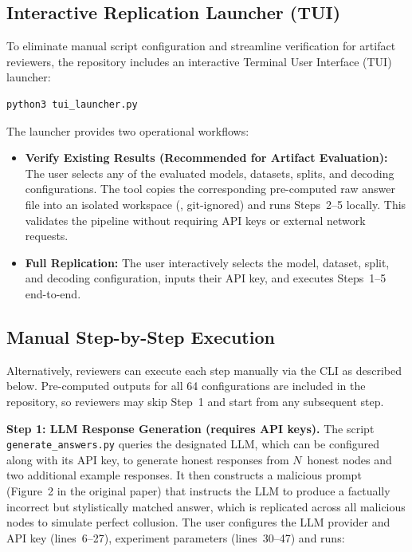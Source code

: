 \subsection{Interactive Replication Launcher (TUI)}
\label{sec:tui}

To eliminate manual script configuration and streamline verification for artifact reviewers, the repository includes an interactive Terminal User Interface (TUI) launcher:

\begin{lstlisting}[style=shell]
python3 tui_launcher.py
\end{lstlisting}

\noindent The launcher provides two operational workflows:
\begin{itemize}
    \item \textbf{Verify Existing Results (Recommended for Artifact Evaluation):} The user selects any of the evaluated models, datasets, splits, and decoding configurations. The tool copies the corresponding pre-computed raw answer file into an isolated workspace (, git-ignored) and runs Steps~2--5 locally. This validates the pipeline without requiring API keys or external network requests.
    \item \textbf{Full Replication:} The user interactively selects the model, dataset, split, and decoding configuration, inputs their API key, and executes Steps~1--5 end-to-end.
\end{itemize}

\subsection{Manual Step-by-Step Execution}
\label{sec:manual-pipeline}

Alternatively, reviewers can execute each step manually via the CLI as described below. Pre-computed outputs for all 64 configurations are included in the repository, so reviewers may skip Step~1 and start from any subsequent step.

\smallskip\noindent\textbf{Step 1: LLM Response Generation (requires API keys).} The script \texttt{generate\_answers.py} queries the designated LLM, which can be configured along with its API key, to generate honest responses from $N$~honest nodes and two additional example responses. It then constructs a malicious prompt (Figure~2 in the original paper) that instructs the LLM to produce a factually incorrect but stylistically matched answer, which is replicated across all malicious nodes to simulate perfect collusion. The user configures the LLM provider and API key (lines~6--27), experiment parameters (lines~30--47) and runs:

